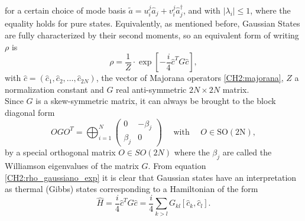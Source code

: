 for a certain choice of mode basis $\tilde{a}=u_{i}^{j}\hat{a}_{j} + v_{i}^{j}\hat{a}_{j}^{\dagger}$, and with $|\lambda_i|\leq 1$, where the equality holds for pure states. Equivalently, as mentioned before, Gaussian States are fully characterized by their second moments, so an equivalent form of writing $\rho$ is
\begin{equation}
\rho= \frac{1}{Z}\cdot \exp \left[-\frac{i}{4} \hat{c}^{T} G \hat{c}\right],
\label{CH2:rho_gaussiano_exp}
\end{equation}
with $\hat{c} = (\hat{c}_1,\hat{c}_2,\ldots,\hat{c}_{2N})$, the vector of Majorana operators \eqref{CH2:majorana}, $Z$ a normalization constant and $G$ real anti-symmetric $2N\times 2N$ matrix. 
\\
Since $G$ is a skew-symmetric matrix, it can always be brought to the block diagonal form 
\begin{equation}
O G O^{T}=\bigoplus_{i=1}^{N}\left(\begin{array}{cc}
0 & -\beta_{j} \\
\beta_{j} & 0
\end{array}\right) \quad \text { with } \quad O \in \mathrm{SO}(2 \mathrm{N}),
\label{CH2:MatrixG_Williamson}
\end{equation}
by a special orthogonal matrix $O\in SO(2N)$ where the $\beta_{j}$ are called the Williamson eigenvalues of the matrix $G$. 
From equation \eqref{CH2:rho_gaussiano_exp} it is clear that Gaussian states have an interpretation as thermal (Gibbs) states corresponding to a Hamiltonian of the form
\begin{equation}
\hat{H}=\frac{i}{4} \hat{c}^{T}G\hat{c}= \frac{i}{4} \sum_{k>l}G_{kl}\left[\hat{c}_{k},\hat{c}_{l}\right].
\label{CH2:Hamiltonian_majorana}
\end{equation}

